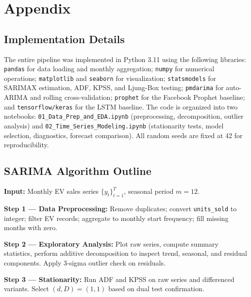 \documentclass[12pt]{article}
\begin{document}
\newpage
\appendix

\section{Appendix}

\subsection{Implementation Details}
\label{app:code}

The entire pipeline was implemented in Python 3.11 using the following libraries: \texttt{pandas} for data loading and monthly aggregation; \texttt{numpy} for numerical operations; \texttt{matplotlib} and \texttt{seaborn} for visualization; \texttt{statsmodels} for SARIMAX estimation, ADF, KPSS, and Ljung-Box testing; \texttt{pmdarima} for auto-ARIMA and rolling cross-validation; \texttt{prophet} for the Facebook Prophet baseline; and \texttt{tensorflow/keras} for the LSTM baseline. The code is organized into two notebooks: \texttt{01\_Data\_Prep\_and\_EDA.ipynb} (preprocessing, decomposition, outlier analysis) and \texttt{02\_Time\_Series\_Modeling.ipynb} (stationarity tests, model selection, diagnostics, forecast comparison). All random seeds are fixed at 42 for reproducibility.

\subsection{SARIMA Algorithm Outline}
\label{app:algorithm}

\noindent\textbf{Input:} Monthly EV sales series $\{y_t\}_{t=1}^{T}$, seasonal period $m=12$.

\noindent\textbf{Step 1 --- Data Preprocessing:} Remove duplicates; convert \texttt{units\_sold} to integer; filter EV records; aggregate to monthly start frequency; fill missing months with zero.

\noindent\textbf{Step 2 --- Exploratory Analysis:} Plot raw series, compute summary statistics, perform additive decomposition to inspect trend, seasonal, and residual components. Apply 3-sigma outlier check on residuals.

\noindent\textbf{Step 3 --- Stationarity:} Run ADF and KPSS on raw series and differenced variants. Select $(d,D)=(1,1)$ based on dual test confirmation.
\end{document}
